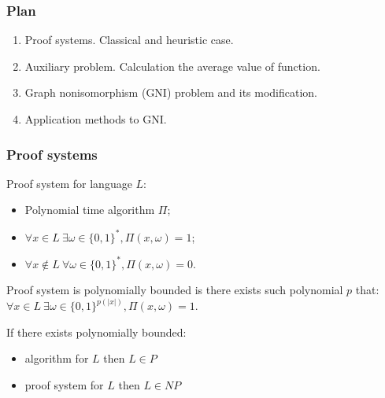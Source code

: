 \begin{frame}
    \frametitle{Plan}

    \begin{enumerate}
	    \item Proof systems. Classical and heuristic case.
    	\item Auxiliary problem. Calculation the average value of function.
    	\item Graph nonisomorphism (GNI) problem and its modification.
    	\item Application methods to GNI.
    \end{enumerate}
\end{frame}

\begin{frame}
	\frametitle{Proof systems}

    \begin{definition}
        Proof system for language $L$:
        \begin{itemize}
            \item Polynomial time algorithm $\Pi$;
            \item $\forall x \in L~ \exists \omega \in \{0, 1\}^{*}, \Pi(x, \omega) = 1$;
        	\item $\forall x \notin L~ \forall \omega \in \{0, 1\}^{*}, 
        		\Pi(x, \omega) = 0$.
        \end{itemize}
    \end{definition}

    \pause
    Proof system is polynomially bounded is there exists such polynomial $p$ that:
    $\forall x \in L~ \exists \omega \in \{0, 1\}^{p(|x|)}, \Pi(x, \omega) = 1$.


    \pause
    If there exists polynomially bounded:
    \begin{itemize}
        \item algorithm for $L$ then $L \in P$
	    \item proof system for $L$ then $L \in NP$
    \end{itemize}

\end{frame}

